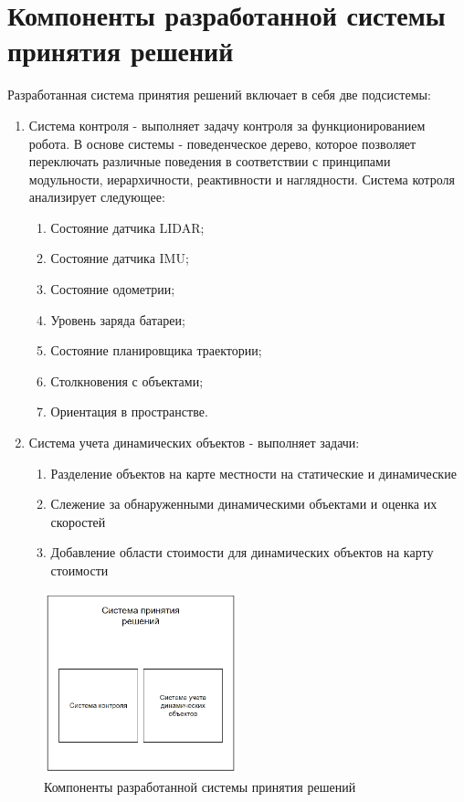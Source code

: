 \section{Компоненты разработанной системы принятия решений}
Разработанная система принятия решений включает в себя две подсистемы:
\begin{enumerate}
    \item Система контроля - выполняет задачу контроля за функционированием робота. В основе системы - поведенческое дерево, которое позволяет переключать различные поведения в соответствии с принципами модульности, иерархичности, реактивности и наглядности. Система котроля анализирует следующее:
    \begin{enumerate}
        \item Состояние датчика LIDAR;
        \item Состояние датчика IMU;
        \item Состояние одометрии;
        \item Уровень заряда батареи;
        \item Состояние планировщика траектории;
        \item Столкновения с объектами;
        \item Ориентация в пространстве.
    \end{enumerate}
    \item Система учета динамических объектов - выполняет задачи:
    \begin{enumerate}
        \item Разделение объектов на карте местности на статические и динамические
        \item Слежение за обнаруженными динамическими объектами и оценка их скоростей
        \item Добавление области стоимости для динамических объектов на карту стоимости
    \end{enumerate}
\end{enumerate}

\begin{figure}[h]
    \centering
    \includegraphics[width=0.5\textwidth]{images/chap_3/dms.png}
    \caption{Компоненты разработанной системы принятия решений}
    \label{fig:dms}
\end{figure}

